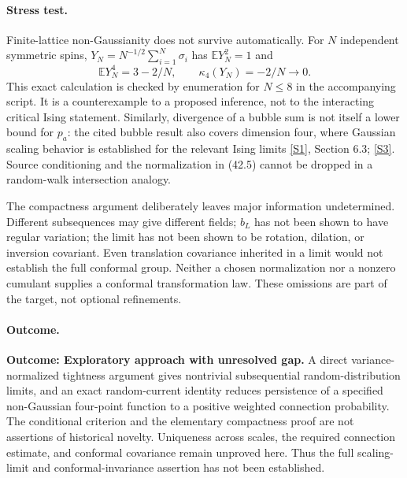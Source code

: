 \documentclass[11pt,a4paper]{article}
\newcommand{\E}{\mathbb{E}}
\newcommand{\sref}[2]{\hyperlink{source:#1:#2}{[S#2]}}
\numberwithin{equation}{section}
\begin{document}
\paragraph{Stress test.}
Finite-lattice non-Gaussianity does not survive automatically. For $N$
independent symmetric spins, $Y_N=N^{-1/2}\sum_{i=1}^N\sigma_i$ has
$\E Y_N^2=1$ and
\[
 \E Y_N^4=3-2/N,\qquad \kappa_4(Y_N)=-2/N\longrightarrow0.
\]
This exact calculation is checked by enumeration for $N\le8$ in the
accompanying script. It is a counterexample to a proposed inference, not
to the interacting critical Ising statement. Similarly, divergence of a
bubble sum is not itself a lower bound for $p_a$: the cited bubble result
also covers dimension four, where Gaussian scaling behavior is established
for the relevant Ising limits \sref{30006692}{1}, Section 6.3; \sref{30006692}{3}.
Source conditioning and the normalization in (42.5) cannot be dropped in a
random-walk intersection analogy.

The compactness argument deliberately leaves major information undetermined.
Different subsequences may give different fields; $b_L$ has not been shown
to have regular variation; the limit has not been shown to be rotation,
dilation, or inversion covariant. Even translation covariance inherited in
a limit would not establish the full conformal group. Neither a chosen
normalization nor a nonzero cumulant supplies a conformal transformation
law. These omissions are part of the target, not optional refinements.

\paragraph{Outcome.}
\textbf{Outcome: Exploratory approach with unresolved gap.}
A direct variance-normalized tightness argument gives nontrivial
subsequential random-distribution limits, and an exact random-current
identity reduces persistence of a specified non-Gaussian four-point
function to a positive weighted connection probability. The conditional
criterion and the elementary compactness proof are not assertions of
historical novelty. Uniqueness across scales, the required connection
estimate, and conformal covariance remain unproved here. Thus the full
scaling-limit and conformal-invariance assertion has not been established.
\end{document}
